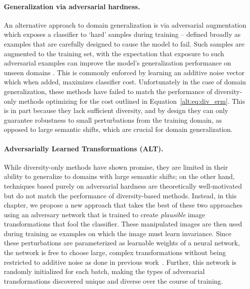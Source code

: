 \paragraph{Generalization via adversarial hardness.}
An alternative approach to domain generalization is via adversarial augmentation  which exposes a classifier to `hard' samples during training -- defined broadly as examples that are carefully designed to cause the model to fail. Such samples are augmented to the training set, with the expectation that exposure to such adversarial examples can improve the model's generalization performance on unseen domains \citep{volpi2018generalizing,qiao2020learning}. This is commonly enforced by learning an additive noise vector which when added, maximizes classifier cost. Unfortunately in the case of domain generalization, these methods have failed to match the performance of diversity-only methods optimizing for the cost outlined in Equation~\ref{alt:eq:div_erm}. This is in part because they lack sufficient diversity, and by design they can only guarantee robustness to small perturbations from the training domain, as opposed to large semantic shifts, which are crucial for domain generalization.



\paragraph{Adversarially Learned Transformations (ALT).}
While diversity-only methods have shown promise, they are limited in their ability to generalize to domains with large semantic shifts; on the  other hand, techniques based purely on adversarial hardness are theoretically well-motivated but do not match the performance of diversity-based methods. Instead, in this chapter, we propose a new approach that takes the best of these two approaches using an adversary network that is trained to create \emph{plausible} image transformations that fool the classifier. These manipulated images are then used during training as examples on which the image must learn invariance. Since these perturbations are parameterized as learnable weights of a neural network, the network is free to choose large, complex transformations without being restricted to additive noise as done in previous work~\citep{volpi2018generalizing}. Further, this network is randomly initialized for each batch, making the types of adversarial transformations discovered unique and diverse over the course of training.  
%

